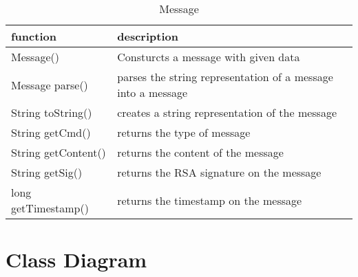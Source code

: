 \begin{table}[h]
    \centering
    \begin{tabular}{p{3.6cm}p{9cm}}
    function            & description\\ \hline
    Message()           & Consturcts a message with given data\\
    
    Message parse()     & parses the string representation of a message into a message\\
    
    String toString()   & creates a string representation of the message\\
    String getCmd()     & returns the type of message\\
    String getContent() & returns the content of the message\\
    String getSig()     & returns the RSA signature on the message\\
    long getTimestamp() & returns the timestamp on the message\\
    \end{tabular}
    \caption{Message}
\end{table}

\section{Class Diagram}
